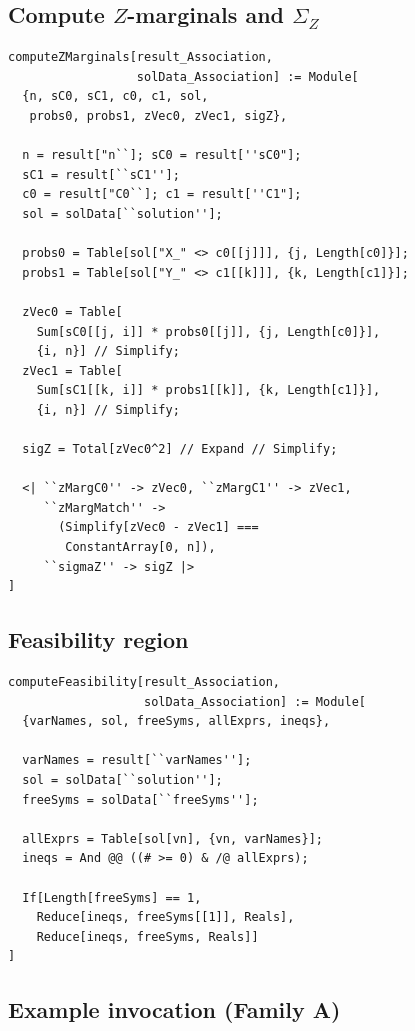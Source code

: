 \documentclass{article}
\newcommand{\SigZ}{\Sigma_Z}
\begin{document}
\subsection{Compute $Z$-marginals and $\SigZ$}

\begin{lstlisting}
computeZMarginals[result_Association,
                  solData_Association] := Module[
  {n, sC0, sC1, c0, c1, sol,
   probs0, probs1, zVec0, zVec1, sigZ},

  n = result["n``]; sC0 = result[''sC0"];
  sC1 = result[``sC1''];
  c0 = result["C0``]; c1 = result[''C1"];
  sol = solData[``solution''];

  probs0 = Table[sol["X_" <> c0[[j]]], {j, Length[c0]}];
  probs1 = Table[sol["Y_" <> c1[[k]]], {k, Length[c1]}];

  zVec0 = Table[
    Sum[sC0[[j, i]] * probs0[[j]], {j, Length[c0]}],
    {i, n}] // Simplify;
  zVec1 = Table[
    Sum[sC1[[k, i]] * probs1[[k]], {k, Length[c1]}],
    {i, n}] // Simplify;

  sigZ = Total[zVec0^2] // Expand // Simplify;

  <| ``zMargC0'' -> zVec0, ``zMargC1'' -> zVec1,
     ``zMargMatch'' ->
       (Simplify[zVec0 - zVec1] ===
        ConstantArray[0, n]),
     ``sigmaZ'' -> sigZ |>
]
\end{lstlisting}

\subsection{Feasibility region}

\begin{lstlisting}
computeFeasibility[result_Association,
                   solData_Association] := Module[
  {varNames, sol, freeSyms, allExprs, ineqs},

  varNames = result[``varNames''];
  sol = solData[``solution''];
  freeSyms = solData[``freeSyms''];

  allExprs = Table[sol[vn], {vn, varNames}];
  ineqs = And @@ ((# >= 0) & /@ allExprs);

  If[Length[freeSyms] == 1,
    Reduce[ineqs, freeSyms[[1]], Reals],
    Reduce[ineqs, freeSyms, Reals]]
]
\end{lstlisting}

\subsection{Example invocation (Family A)}
\end{document}
